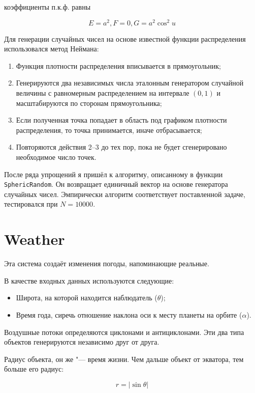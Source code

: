 \documentclass[a4paper,12pt,fleqn]{article}
\begin{document}
коэффициенты п.к.ф. равны

\[E = a^2, F = 0, G = a^2 \cos^2 u\]

Для генерации случайных чисел на основе известной функции распределения использовался метод Неймана:

\begin{enumerate}
\item Функция плотности распределения вписывается в прямоугольник;
\item Генерируются два независимых числа эталонным генератором случайной величины с равномерным распределением на интервале $(0, 1)$ и масштабируются по сторонам прямоугольника;
\item Если полученная точка попадает в область под графиком плотности распределения, то точка принимается, иначе отбрасывается;
\item Повторяются действия 2--3 до тех пор, пока не будет сгенерировано необходимое число точек.                                                                                            \end{enumerate}

После ряда упрощений я пришёл к алгоритму, описанному в функции \verb|SphericRandom|.
Он возвращает единичный вектор на основе генератора случайных чисел.
Эмпирически алгоритм соответствует поставленной задаче, тестировался при $N = 10000$.

\section{Weather}

Эта система создаёт изменения погоды, напоминающие реальные.

В качестве входных данных используются следующие:

\begin{itemize}
\item Широта, на которой находится наблюдатель ($\theta$);
\item Время года, сиречь отношение наклона оси к месту планеты на орбите ($\alpha$).                                                    \end{itemize}

Воздушные потоки определяются циклонами и антициклонами.
Эти два типа объектов генерируются независимо друг от друга.

Радиус объекта, он же "--- время жизни.
Чем дальше объект от экватора, тем больше его радиус:

\[r = | \sin \theta |\]
\end{document}
